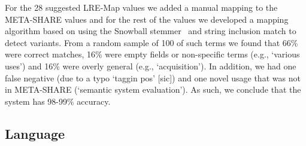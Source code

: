 \documentclass[smallextended]{svjour3}       %
\begin{document}
For the 28 suggested LRE-Map values we added a manual mapping to the META-SHARE
values and for the rest of the values we developed a mapping algorithm based on
using the Snowball stemmer~\cite{porter2001snowball} and string inclusion match to detect
variants. From a random sample of 100 of such terms we found that 66\% were
correct matches, 16\% were empty fields or non-specific terms (e.g., `various
uses') and 16\% were overly general (e.g., `acquisition'). In addition, we had
one false negative (due to a typo `taggin pos' [sic]) and one novel usage that
was not in META-SHARE (`semantic system evaluation'). As such, we conclude that
the system has 98-99\% accuracy.

\subsection{Language}

\begin{table}
    \caption{\label{tab:language-comparison}Accuracy of language mappings}
\end{table}
\end{document}
